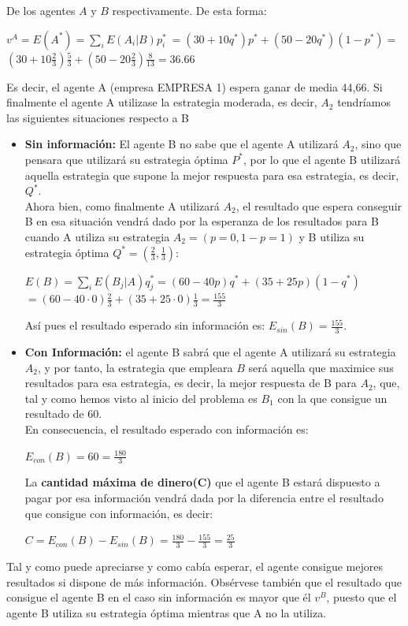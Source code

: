 De los agentes $A$ y $B$ respectivamente. De esta forma:
\begin{center}
    $v^A=E(A^*) = \underset{i}{\sum}E(A_i|B)p_i^* \: = (30+10q^*)p^*+(50-20q^*)(1-p^*)=$\\
    $\left( 30+10\frac{2}{3}\right)\frac{5}{3}+\left( 50-20\frac{2}{3}\right)\frac{8}{13}=36.66$
\end{center}
Es decir, el agente A (empresa EMPRESA 1) espera ganar de media 44,66.
Si finalmente el agente A utilizase la estrategia  moderada, es decir, $A_2$ tendríamos las siguientes situaciones respecto a B
\begin{itemize}
    \item \textbf{Sin información:}  El agente B no sabe que el agente A utilizará $A_2$, sino que pensara que utilizará su estrategia óptima $P^*$, por lo que el agente B utilizará aquella estrategia que supone la mejor respuesta para esa estrategia, es decir, $Q^*$.
    \\
    Ahora bien, como finalmente A  utilizará $A_2$, el resultado que espera conseguir B en esa situación vendrá dado por la esperanza de los resultados para B cuando A utiliza su estrategia $A_2=(p=0,1-p=1) $ y B utiliza su estrategia óptima $Q^*=(\frac{2}{3},\frac{1}{3})$:
    \begin{center}
        $ E(B)=\underset{i}{\sum}E(B_j|A)q_j^*=(60-40p)q^*+(35+25p)(1-q^*)$\\
        $ = (60-40\cdot 0)\frac{2}{3}+(35+25\cdot 0)\frac{1}{3}=\frac{155}{3}$\\
    \end{center}

Así pues el resultado esperado sin información es: $ E_{sin}(B)=\frac{155}{3}$.
    \item \textbf{Con Información:} el agente B sabrá que el agente A utilizará su estrategia $A_2$, y por tanto, la estrategia que empleara $B$ será aquella que maximice sus resultados para esa estrategia, es decir, la mejor respuesta de B para $A_2$, que, tal y como hemos visto  al inicio del problema es $B_1$ con la que consigue un resultado de 60.
    \\
    En consecuencia, el resultado esperado con información es:  
    \begin{center}
        $E_{con}(B)=60=\frac{180}{3}$ \\
    \end{center}

    La \textbf{cantidad máxima de dinero(C)} que el agente B  estará dispuesto a pagar por esa información vendrá dada por la diferencia entre el resultado que consigue    con información, es decir:
    \begin{center}
        $ C= E_{con}(B)-E_{sin}(B)=\frac{180}{3}-\frac{155}{3}=\frac{25}{3}$
    \end{center}
\end{itemize}
Tal y como puede apreciarse y como cabía esperar, el agente consigue mejores resultados si dispone de más información.
Obsérvese también que el resultado que consigue el agente B en el caso sin información es mayor que él $v^B$, puesto que el agente B utiliza su estrategia óptima mientras que A no la utiliza.

